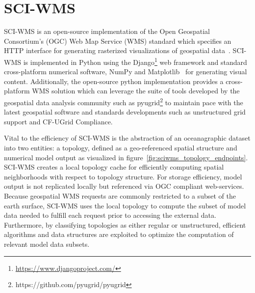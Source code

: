 \documentclass[11pt,twocolumn,twoside]{IEEEtran}
\newcommand{\ogc}{OGC}
\newcommand{\wms}{WMS}
\newcommand{\sciwms}{SCI-WMS}
\newcommand{\Sciwms}{SCI-WMS}
\begin{document}
\section{\sciwms{}}
\Sciwms{} is an open-source implementation of the Open Geospatial
Consortium's (\ogc{}) Web Map Service (\wms{}) standard which
specifies an HTTP interface for generating rasterized visualizations
of geospatial data~\cite{wms14}. \sciwms{} is implemented in Python
using the Django\footnote{\url{https://www.djangoproject.com/}} web
framework and standard cross-platform numerical software, NumPy and
Matplotlib~\cite{numpy11, hunter07} for generating visual
content. Additionally, the open-source python implementation provides
a cross-platform \wms{} solution which can leverage the suite of tools
developed by the geospatial data analysis community such as
pyugrid\footnote{https://github.com/pyugrid/pyugrid} to maintain pace
with the latest geospatial software and standards developments such as
unstructured grid support and CF-UGrid Compliance.

Vital to the efficiency of \sciwms{} is the abstraction
of an oceanagraphic dataset into two entities: a topology, defined as
a geo-referenced spatial structure and numerical model output as
visualized in figure~\ref{fig:sciwms_topology_endpoints}. \Sciwms{}
creates a local topology cache for efficiently computing spatial
neighborhoods with respect to topology structure.  For storage
efficiency, model output is not replicated locally but referenced via
OGC compliant web-services. Because geospatial \wms{} requests are
commonly restricted to a subset of the earth surface, \sciwms{} uses
the local topology to compute the subset of model data needed to
fulfill each request prior to accessing the external
data. Furthermore, by classifying topologies as either regular or
unstructured, efficient algorithms and data structures are exploited
to optimize the computation of relevant model data subsets.
\end{document}
